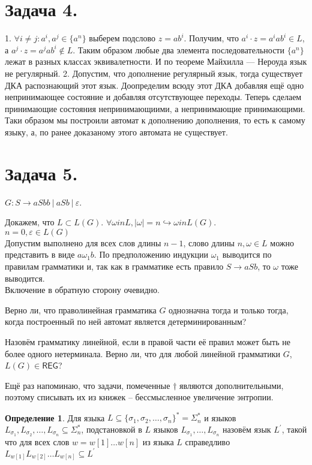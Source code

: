 \documentclass[12pt]{article}
\theoremstyle{definition}
\theoremstyle{definition}
\newtheorem{Def}{Определение}
\let\ra\rightarrow
\let\eps\varepsilon
\let\o\omega
\def\REG{{\mathsf{REG}}}
\newcounter{problem}
\newcounter{subproblem}
\def\prp{\medskip\noindent\stepcounter{problem}{\bf Задача \theproblem .  }\setcounter{subproblem}{0} }
\begin{document}
\section*{Задача  4.}
1. $\forall i \neq j : a^i, a^j \in \{a^n\}$ выберем подслово $z = ab^i$. Получим, что $a^i\cdot z=a^iab^i \in L$, а $a^j\cdot z=a^jab^i \notin L$. Таким образом любые два элемента последовательности $\{a^n\}$ лежат в разных классах эквивалетности. И по теореме Майхилла — Нероуда язык не регулярный.
2. Допустим, что дополнение регулярный язык, тогда существует ДКА распознающий этот язык. Доопределим всюду этот ДКА добавляя ещё одно непринимающее состояние и добавляя отсутствующее переходы. Теперь сделаем принимающие состояния непринимающиими, а непринимающие принимающими. Таки образом мы построили автомат к дополнению дополнения, то есть к самому языку, а, по ранее доказаному этого автомата не существует. 

\section*{Задача  5.}
$G: S \ra aSbb\ |\ aSb\ |\ \eps$.


Докажем, что $L\subset L(G)$. $\forall \o in L, |\o| = n \hookrightarrow \o in L(G)$. \\
$n = 0, \eps \in L(G)$\\
Допустим выполнено для всех слов длины $n-1$, слово длины $n, \o \in L$ можно представить в виде $a\o_1b$. По предположению индукции $\o_1$ выводится по правилам грамматики и, так как в грамматике есть правило $S \ra aSb$, то $\o$ тоже выводится.\\
Включение в обратную сторону очевидно.

	\prp Верно ли, что праволинейная грамматика $G$ однозначна тогда и только тогда, когда построенный по ней автомат является детерминированным?

	\prp Назовём грамматику линейной, если в правой части её правил может быть не более одного нетерминала. Верно ли, что для любой линейной грамматики $G$, $L(G) \in \REG$?

	\bigskip

	Ещё раз напоминаю, что задачи, помеченные $\dagger$ являются дополнительными, поэтому списывать их из книжек -- бессмысленное увеличение энтропии.

	\begin{Def}
		Для языка $L \subseteq \{\sigma_1,\sigma_2,\ldots,\sigma_n\}^* = \Sigma_n^*$ и языков $L_{\sigma_1}, L_{\sigma_2}, \ldots, L_{\sigma_n} \subseteq \Sigma_n^* $, подстановкой  в $L$ языков $L_{\sigma_1},\ldots, L_{\sigma_n}$ назовём язык $L^{\prime} $, такой что для всех слов $w = w[1]\ldots w[n]$ из языка $L$ справедливо $ L_{w[1]}L_{w[2]}\ldots L_{w[n]} \subseteq L^{\prime}$
	\end{Def}
\end{document}
